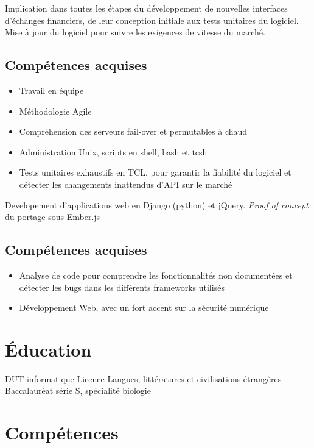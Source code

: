 \documentclass{cv}
\begin{document}
{Implication dans toutes les étapes du développement de nouvelles interfaces d'échanges financiers, de leur conception initiale aux tests unitaires du logiciel. Mise à jour du logiciel pour suivre les exigences de vitesse du marché.}
\subsection{Compétences acquises}
\begin{itemize}
    \item {Travail en équipe}
    \item {Méthodologie Agile}
    \item {Compréhension des serveurs fail-over et permutables à chaud}
    \item {Administration Unix, scripts en shell, bash et tcsh}
    \item {Tests unitaires exhaustifs en TCL, pour garantir la fiabilité du logiciel et détecter les changements inattendus d'API sur le marché}
\end{itemize}

\pagebreak
{}
{Developement d'applications web en Django (python) et jQuery. \textit{Proof of concept} du portage sous Ember.js}
\subsection{Compétences acquises}
\begin{itemize}
    \item {Analyse de code pour comprendre les fonctionnalités non documentées et détecter les bugs dans les différents frameworks utilisés}
    \item {Développement Web, avec un fort accent sur la sécurité numérique}
\end{itemize}

\section{Éducation}
{DUT informatique}
{Licence Langues, littératures et civilisations étrangères }
{Baccalauréat série S, spécialité biologie}

\section{Compétences}
\end{document}
